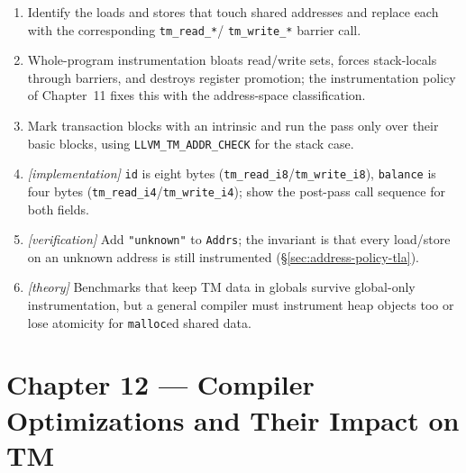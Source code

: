 \begin{enumerate}
    \item Identify the loads and stores that touch shared addresses and
          replace each with the corresponding \texttt{tm\_read\_*}/%
          \texttt{tm\_write\_*} barrier call.
    \item Whole-program instrumentation bloats read/write sets, forces
          stack-locals through barriers, and destroys register promotion;
          the instrumentation policy of Chapter~11 fixes this with the
          address-space classification.
    \item Mark transaction blocks with an intrinsic and run the pass only
          over their basic blocks, using \texttt{LLVM\_TM\_ADDR\_CHECK} for
          the stack case.
    \item \emph{[implementation]} \texttt{id} is eight bytes
          (\texttt{tm\_read\_i8}/\texttt{tm\_write\_i8}), \texttt{balance}
          is four bytes (\texttt{tm\_read\_i4}/\texttt{tm\_write\_i4}); show
          the post-pass call sequence for both fields.
    \item \emph{[verification]} Add \texttt{"unknown"} to \texttt{Addrs};
          the invariant is that every load/store on an unknown address is
          still instrumented (\S\ref{sec:address-policy-tla}).
    \item \emph{[theory]} Benchmarks that keep TM data in globals survive
          global-only instrumentation, but a general compiler must
          instrument heap objects too or lose atomicity for
          \texttt{malloc}ed shared data.
\end{enumerate}

\section*{Chapter 12 --- Compiler Optimizations and Their Impact on TM}

